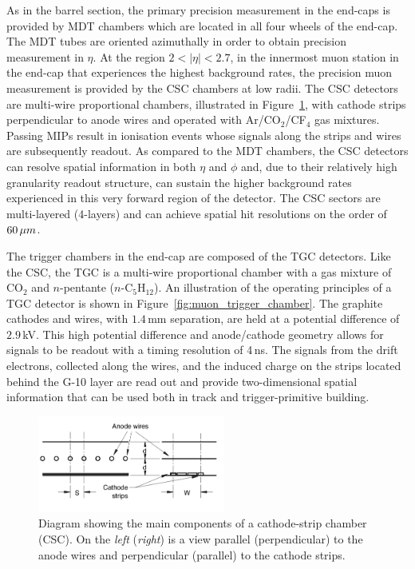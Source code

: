 As in the barrel section, the primary precision measurement in the end-caps is provided
by MDT chambers which are located in all four wheels of the end-cap.
The MDT tubes are oriented azimuthally in order to obtain precision measurement in $\eta$.
At the region $2 < \lvert \eta \rvert < 2.7$, in the innermost muon station
in the end-cap that experiences the highest background rates,
the precision muon measurement is provided by the CSC chambers at low radii.
The CSC detectors are multi-wire proportional chambers, illustrated in Figure~\ref{fig:csc_chamber},
with cathode strips perpendicular to anode wires and operated with Ar/CO$_2$/CF$_4$ gas mixtures.
Passing MIPs result in ionisation events whose signals along the strips and wires are
subsequently readout.
As compared to the MDT chambers, the CSC detectors can resolve spatial information in both $\eta$ and $\phi$
and, due to their relatively high granularity readout structure, can sustain the higher
background rates experienced in this very forward region of the detector.
The CSC sectors are multi-layered (4-layers) and can achieve spatial hit resolutions on the order
of $60\,\mu m$.

The trigger chambers in the end-cap are composed of the TGC detectors.
Like the CSC, the TGC is a multi-wire proportional chamber with a gas mixture
of CO$_2$ and $n$-pentante ($n$-C$_5$H$_{12}$).
An illustration of the operating principles of a TGC detector is shown in Figure~\ref{fig:muon_trigger_chamber}.
The graphite cathodes and wires, with $1.4$\,mm separation, are held at a potential
difference of $2.9$\,kV.
This high potential difference and anode/cathode geometry allows for signals to be readout
with a timing resolution of 4\,ns.
The signals from the drift electrons, collected along the wires, and the induced
charge on the strips located behind the G-10 layer are read out and provide
two-dimensional spatial information that can be used both in track and trigger-primitive building.


\begin{figure}[!htb]
    \begin{center}
        \includegraphics[width=0.55\textwidth]{figures/chapter2/muon_spec/csc_chamber}
        \caption{
            Diagram showing the main components of a cathode-strip chamber (CSC).
            On the \textit{left} (\textit{right}) is a view parallel (perpendicular) to the anode
            wires and perpendicular (parallel) to the cathode strips.
        }
        \label{fig:csc_chamber}
    \end{center}
\end{figure}

